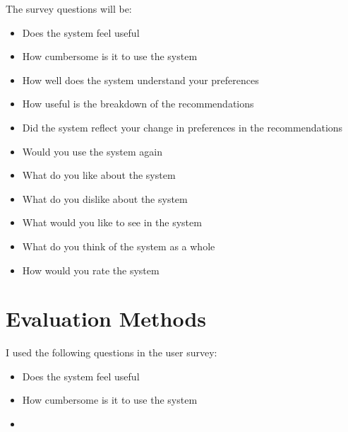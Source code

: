 The survey questions will be:
\begin{itemize}
    \item Does the system feel useful
    \item How cumbersome is it to use the system
    \item How well does the system understand your preferences
    \item How useful is the breakdown of the recommendations
    \item Did the system reflect your change in preferences in the recommendations
    \item Would you use the system again
    \item What do you like about the system
    \item What do you dislike about the system
    \item What would you like to see in the system
    \item What do you think of the system as a whole
    \item How would you rate the system
\end{itemize}





\section{Evaluation Methods}
\label{sec:evaluation_methods}
I used the following questions in the user survey:
\begin{itemize}
    \item Does the system feel useful
    \item How cumbersome is it to use the system
    \item 
\end{itemize}

